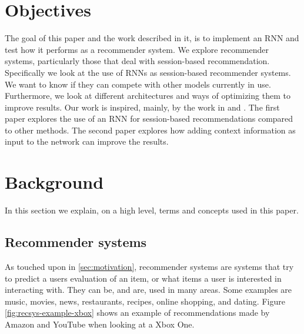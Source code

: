 \section{Objectives}
The goal of this paper and the work described in it, is to implement an RNN and test how it performs as a recommender system. We explore recommender systems, particularly those that deal with session-based recommendation. Specifically we look at the use of RNNs as session-based recommender systems. We want to know if they can compete with other models currently in use. Furthermore, we look at different architectures and ways of optimizing them to improve results. Our work is inspired, mainly, by the work in \cite{DBLP:journals/corr/HidasiKBT15} and \cite{DBLP:journals/corr/LiuWWL016}. The first paper explores the use of an RNN for session-based recommendations compared to other methods. The second paper explores how adding context information as input to the network can improve the results.





\section{Background}
In this section we explain, on a high level, terms and concepts used in this paper.

\subsection{Recommender systems}
As touched upon in \ref{sec:motivation}, recommender systems are systems that try to predict a users evaluation of an item, or what items a user is interested in interacting with. They can be, and are, used in many areas. Some examples are music, movies, news, restaurants, recipes, online shopping, and dating. Figure \ref{fig:recsys-example-xbox} shows an example of recommendations made by Amazon and YouTube when looking at a Xbox One.
	
